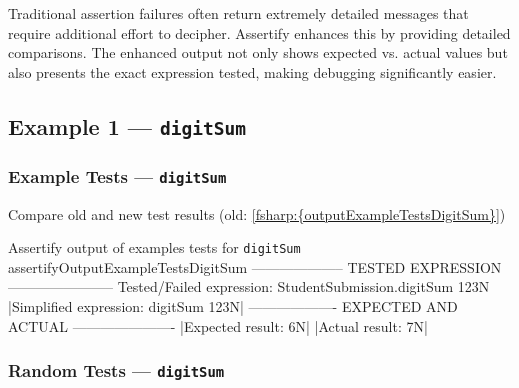 

Traditional assertion failures often return extremely detailed messages that require additional effort to decipher.
Assertify enhances this by providing detailed comparisons. 
The enhanced output not only shows expected vs. actual values but also presents the exact expression tested, making debugging significantly easier.


\newpage %
\subsection{Example 1 --- \texttt{digitSum}} %


\todo{}


\subsubsection{Example Tests --- \texttt{digitSum}} %


\begin{todolist}
    \item Compare old and new test results (old: \ref{fsharp:{outputExampleTestsDigitSum}})
\end{todolist}


\begin{fsharpoutput}%
{Assertify output of examples tests for \texttt{digitSum}}%
{assertifyOutputExampleTestsDigitSum}
-------------------- TESTED EXPRESSION -----------------------
Tested/Failed expression:   StudentSubmission.digitSum 123N
|{\color{blue}Simplified expression:      digitSum 123N}|
------------------- EXPECTED AND ACTUAL ----------------------
|{\color{green!70!black}Expected result:            6N}|
|{\color{red}Actual result:              7N}|
\end{fsharpoutput}


\subsubsection{Random Tests --- \texttt{digitSum}} %


